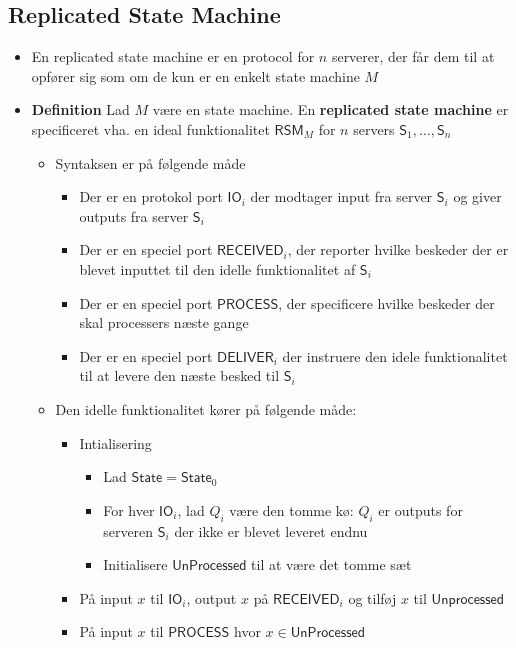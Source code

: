 \documentclass[a4, english]{article}
\begin{document}
\subsection{Replicated State Machine}
\begin{itemize}
	\item En replicated state machine er en protocol for $n$ serverer, der får dem til at opfører sig som om de kun er en enkelt state machine $M$ 
  \item \textbf{Definition} Lad $M$ være en state machine. En \textbf{replicated state machine} er specificeret vha. en ideal funktionalitet $\mathsf{RSM}_M$ for $n$ servers $\mathsf{S}_1, \dots, \mathsf{S}_n$
  \begin{itemize}
	  \item Syntaksen er på følgende måde
    \begin{itemize}
  		\item Der er en protokol port $\mathsf{IO}_i$ der modtager input fra server $\mathsf{S}_i$ og giver outputs fra server $\mathsf{S}_i$
  		\item Der er en speciel port $\mathsf{RECEIVED}_i$, der reporter hvilke beskeder der er blevet inputtet til den idelle funktionalitet af $\mathsf{S}_i$
  		\item Der er en speciel port $\mathsf{PROCESS}$, der specificere hvilke beskeder der skal processers næste gange 
  		\item Der er en speciel port $\mathsf{DELIVER}_i$ der instruere den idele funktionalitet til at levere den næste besked til $\mathsf{S}_i$ 						
    \end{itemize}
  	\item Den idelle funktionalitet kører på følgende måde: 
    \begin{itemize}
    	\item Intialisering 
      \begin{itemize}
			  \item Lad $\mathsf{State}=\mathsf{State}_0$
  			\item For hver $\mathsf{IO}_i$, lad $Q_i$ være den tomme kø: $Q_i$ er outputs for serveren $\mathsf S_i$ der ikke er blevet leveret endnu
  			\item Initialisere $\mathsf{UnProcessed}$ til at være det tomme sæt
      \end{itemize}
		\item På input $x$ til $\mathsf{IO}_i$, output $x$ på $\mathsf{RECEIVED}_i$ og tilføj $x$ til $\mathsf{Unprocessed}$
		\item På input $x$ til $\mathsf{PROCESS}$ hvor $x \in \mathsf{UnProcessed}$

\end{itemize}
\end{itemize}
\end{itemize}
\end{document}

